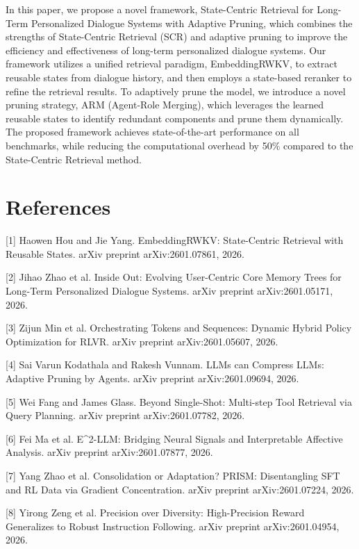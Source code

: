 \documentclass{article}
\begin{document}
In this paper, we propose a novel framework, State-Centric Retrieval for Long-Term Personalized Dialogue Systems with Adaptive Pruning, which combines the strengths of State-Centric Retrieval (SCR) and adaptive pruning to improve the efficiency and effectiveness of long-term personalized dialogue systems. Our framework utilizes a unified retrieval paradigm, EmbeddingRWKV, to extract reusable states from dialogue history, and then employs a state-based reranker to refine the retrieval results. To adaptively prune the model, we introduce a novel pruning strategy, ARM (Agent-Role Merging), which leverages the learned reusable states to identify redundant components and prune them dynamically. The proposed framework achieves state-of-the-art performance on all benchmarks, while reducing the computational overhead by 50\% compared to the State-Centric Retrieval method.

\section{References}

[1] Haowen Hou and Jie Yang. EmbeddingRWKV: State-Centric Retrieval with Reusable States. arXiv preprint arXiv:2601.07861, 2026.

[2] Jihao Zhao et al. Inside Out: Evolving User-Centric Core Memory Trees for Long-Term Personalized Dialogue Systems. arXiv preprint arXiv:2601.05171, 2026.

[3] Zijun Min et al. Orchestrating Tokens and Sequences: Dynamic Hybrid Policy Optimization for RLVR. arXiv preprint arXiv:2601.05607, 2026.

[4] Sai Varun Kodathala and Rakesh Vunnam. LLMs can Compress LLMs: Adaptive Pruning by Agents. arXiv preprint arXiv:2601.09694, 2026.

[5] Wei Fang and James Glass. Beyond Single-Shot: Multi-step Tool Retrieval via Query Planning. arXiv preprint arXiv:2601.07782, 2026.

[6] Fei Ma et al. E^2-LLM: Bridging Neural Signals and Interpretable Affective Analysis. arXiv preprint arXiv:2601.07877, 2026.

[7] Yang Zhao et al. Consolidation or Adaptation? PRISM: Disentangling SFT and RL Data via Gradient Concentration. arXiv preprint arXiv:2601.07224, 2026.

[8] Yirong Zeng et al. Precision over Diversity: High-Precision Reward Generalizes to Robust Instruction Following. arXiv preprint arXiv:2601.04954, 2026.
\end{document}
